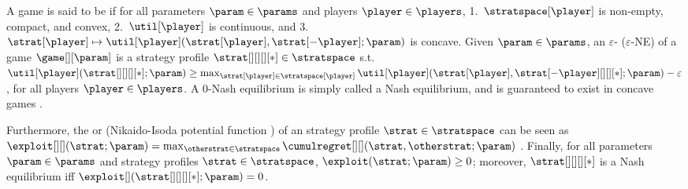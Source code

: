 A game is said to be  if for all parameters $\param \in \params$ and players $\player \in \players$, 1.~$\stratspace[\player]$ is non-empty, compact, and convex, 2.~$\util[\player]$ is continuous, and 3.~$\strat[\player] \mapsto \util[\player](\strat[\player], \strat[-\player]; \param)$ is concave.
Given $\param \in \params$, an $\varepsilon$- ($\varepsilon$-NE) of a game $\game[][\param]$ is a strategy profile 
$\strat[][][][*] \in \stratspace$ s.t.\ $\util[\player](\strat[][][][*]; \param) \geq \max_{\strat[\player] \in \stratspace[\player]} \util[\player](\strat[\player], \strat[-\player][][][*]; \param) - \varepsilon$, for all players $\player \in \players$.
A $0$-Nash equilibrium is simply called a Nash equilibrium, and
is guaranteed to exist in concave games \citep{nash1950existence, arrow-debreu}. 


Furthermore, the  or (Nikaido-Isoda potential function \citep{nikaido1955note}) of an strategy profile $\strat \in \stratspace$ can be seen as $\exploit[][] (\strat; \param) = \max_{\otherstrat \in \stratspace} \cumulregret[][] (\strat, \otherstrat; \param)$ \citep{goktas2022exploit}. 
Finally, for all parameters $\param \in \params$ and strategy profiles $\strat \in \stratspace$, $\exploit(\strat; \param) \geq 0$; moreover, $\strat[][][][*]$ is a Nash equilibrium iff $\exploit[] (\strat[][][][*]; \param) = 0$. 
\fi

